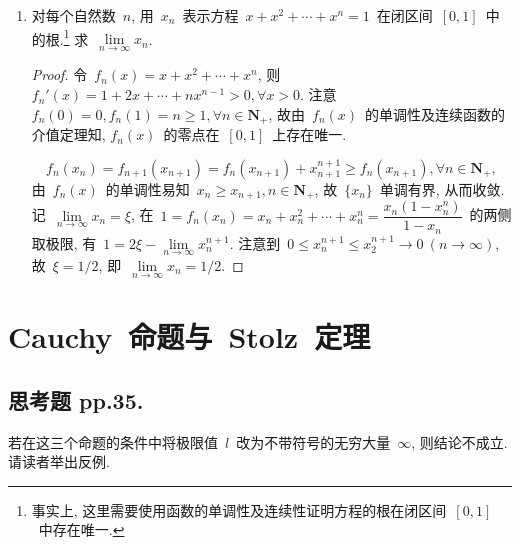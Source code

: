 \documentclass[UTF8,a4paper,10pt,twoside]{book}
\begin{document}
\begin{enumerate}
\begin{proof}
		      充分性. 不妨设~$\{a_n\}$~单调增加, 则其任意子列也单调增加. 设~$\lim\limits_{n\to\infty} x_{n_k}=a$. 则由~3~可知, $\forall k\in\mathbf{N}_{+}, a_{n_k}\leqslant a$. 若~$\{a_n\}$~无上界, 则存在~$n_0\in\mathbf{N}_{+}$~使得~$x_{n_0}>a$, 从而对于充分大的~$k\in\mathbf{N}_{+}$, 有~$a_{n_k}\geqslant a_{n_0}>a$. 这与~$a_{n_k}\leqslant a, \forall k\in\mathbf{N}_{+}$~矛盾. 故~$\{a_n\}$~有上界. 从而由单调有界原理, $\{a_n\}$~收敛.
	      \end{proof}
	\item 对每个自然数~$n$, 用~$x_n$~表示方程~$x+x^2+\cdots+x^n=1$~在闭区间~$[0,1]$~中的根.\footnote{事实上, 这里需要使用函数的单调性及连续性证明方程的根在闭区间~$[0,1]$~中存在唯一.} 求~$\lim\limits_{n\to\infty} x_n$.
	      \begin{proof}
		      令~$f_n(x)=x+x^2+\cdots+x^n$, 则~$f_n'(x)=1+2x+\cdots+nx^{n-1}>0, \forall x>0$. 注意~$f_n(0)=0, f_n(1)=n\geqslant 1, \forall n\in\mathbf{N}_{+}$, 故由~$f_n(x)$~的单调性及连续函数的介值定理知, $f_n(x)$~的零点在~$[0,1]$~上存在唯一.

		      \[
			      f_n(x_n)=f_{n+1}(x_{n+1})=f_n(x_{n+1})+x_{n+1}^{n+1}\geqslant f_n(x_{n+1}), \forall n\in\mathbf{N}_{+},
		      \]
		      由~$f_n(x)$~的单调性易知~$x_n\geqslant x_{n+1}, n\in\mathbf{N}_{+}$, 故~$\{x_n\}$~单调有界, 从而收敛. 记~$\lim\limits_{n\to\infty} x_n=\xi$, 在~$1=f_n(x_n)=x_n+x_n^2+\cdots+x_n^n=\dfrac{x_n(1-x_n^n)}{1-x_n}$~的两侧取极限, 有~$1=2\xi-\lim\limits_{n\to\infty} x_n^{n+1}$. 注意到~$0\leqslant x_n^{n+1}\leqslant x_2^{n+1}\to 0\ (n\to\infty)$, 故~$\xi=1/2$, 即~$\lim\limits_{n\to\infty} x_n=1/2$.\qedhere
	      \end{proof}
\end{enumerate}

\section{Cauchy~命题与~Stolz~定理}
\subsection{思考题 pp.35.}
若在这三个命题的条件中将极限值~$l$~改为不带符号的无穷大量~$\infty$, 则结论不成立. 请读者举出反例.
\end{document}
